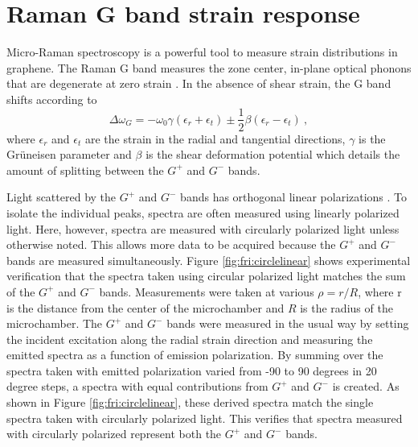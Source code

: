 \section{Raman G band strain response\label{sec:fri:Raman}}
Micro-Raman spectroscopy is a powerful tool to measure strain distributions in graph\-ene.
The Raman G band measures the zone center, in-plane optical phonons that are degenerate at zero strain \cite{Tuinstra1970,Ferrari2006}.
In the absence of shear strain, the G band shifts according to \cite{Huang2009}
\begin{equation}
	\Delta \omega_G=-\omega_0 \gamma(\epsilon_{r}+\epsilon_{t}) \pm \frac{1}{2} \beta (\epsilon_{r}-\epsilon_{t}) \ ,
\end{equation}
where $\epsilon_{r}$ and $\epsilon_{t}$ are the strain in the radial and tangential directions,  $\gamma$ is the Gr\"{u}neisen parameter and $\beta$ is the shear deformation potential which details the amount of splitting between the $G^+$ and $G^-$ bands.

Light scattered by the $G^+$ and $G^-$  bands has orthogonal linear polarizations \cite{Huang2009}.
To isolate the individual peaks, spectra are often measured using linearly polarized light.
Here, however, spectra are measured with circularly polarized light unless otherwise noted.
This allows more data to be acquired because the $G^+$ and $G^-$ bands are measured simultaneously.
Figure \ref{fig:fri:circlelinear} shows experimental verification that the spectra taken using circular polarized light matches the sum of the $G^+$ and $G^-$ bands.
Measurements were taken at various $\rho=r/R$, where r is the distance from the center of the microchamber and $R$ is the radius of the microchamber.
The $G^+$ and $G^-$ bands were measured in the usual way by setting the incident excitation along the radial strain direction and measuring the emitted spectra as a function of emission polarization.
By summing over the spectra taken with emitted polarization varied from -90 to 90 degrees in 20 degree steps, a spectra with equal contributions from $G^+$ and $G^-$ is created.
As shown in Figure \ref{fig:fri:circlelinear}, these derived spectra match the single spectra taken with circularly polarized light. 
This verifies that spectra measured with circularly polarized represent both the $G^+$ and $G^-$ bands.

